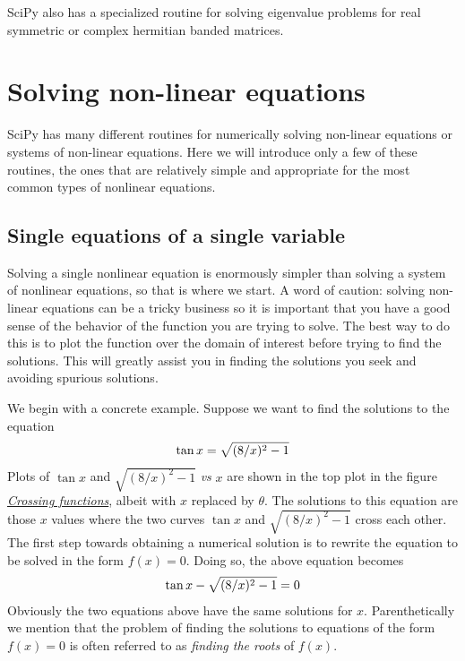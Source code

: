\documentclass[letterpaper,10pt,english]{sphinxmanual}
\begin{document}
SciPy also has a specialized routine  for solving eigenvalue problems for real symmetric or complex hermitian banded matrices.


\section{Solving non-linear equations}
\label{chap9/chap9_scipy:solving-non-linear-equations}\label{chap9/chap9_scipy:sec-findingroots}\label{chap9/chap9_scipy:index-11}
SciPy has many different routines for numerically solving non-linear equations or systems of non-linear equations.  Here we will introduce only a few of these routines, the ones that are relatively simple and appropriate for the most common types of nonlinear equations.


\subsection{Single equations of a single variable}
\label{chap9/chap9_scipy:single-equations-of-a-single-variable}
Solving a single nonlinear equation is enormously simpler than solving a system of nonlinear equations, so that is where we start.  A word of caution: solving non-linear equations can be a tricky business so it is important that you have a good sense of the behavior of the function you are trying to solve.  The best way to do this is to plot the function over the domain of interest before trying to find the solutions.  This will greatly assist you in finding the solutions you seek and avoiding spurious solutions.

We begin with a concrete example.  Suppose we want to find the solutions to the equation
\begin{gather}
\begin{split}\tan x=\sqrt{(8/x)^2-1}\end{split}\notag
\end{gather}
Plots of \(\tan x\) and \(\sqrt{(8/x)^2-1}\) \emph{vs} \(x\) are shown in the top plot in the figure {\hyperref[chap5/chap5_plot:fig-subplotdemo]{\emph{Crossing functions}}}, albeit with \(x\) replaced by \(\theta\).  The solutions to this equation are those \(x\) values where the two curves \(\tan x\) and \(\sqrt{(8/x)^2-1}\) cross each other. The first step towards obtaining a numerical solution is to rewrite the equation to be solved in the form \(f(x)=0\).  Doing so, the above equation becomes
\begin{gather}
\begin{split}\tan x - \sqrt{(8/x)^2-1} = 0\end{split}\notag
\end{gather}
Obviously the two equations above have the same solutions for \(x\).  Parenthetically we mention that the problem of finding the solutions to equations of the form \(f(x)=0\) is often referred to as \emph{finding the roots} of \(f(x)\).
\end{document}
